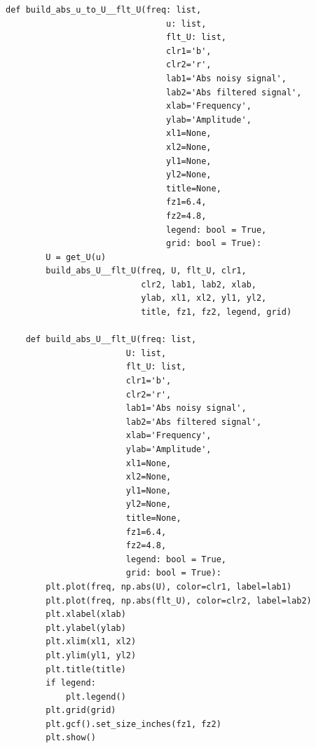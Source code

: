 \documentclass[a4paper, 12pt]{article}
\begin{document}
\begin{lstlisting}[label=l3, caption={Файл builder.py. Реализация построения графиков}]
    def build_abs_u_to_U__flt_U(freq: list,
                                u: list,
                                flt_U: list,
                                clr1='b',
                                clr2='r',
                                lab1='Abs noisy signal',
                                lab2='Abs filtered signal',
                                xlab='Frequency',
                                ylab='Amplitude',
                                xl1=None,
                                xl2=None,
                                yl1=None,
                                yl2=None,
                                title=None,
                                fz1=6.4,
                                fz2=4.8,
                                legend: bool = True,
                                grid: bool = True):
        U = get_U(u)
        build_abs_U__flt_U(freq, U, flt_U, clr1,
                           clr2, lab1, lab2, xlab,
                           ylab, xl1, xl2, yl1, yl2,
                           title, fz1, fz2, legend, grid)

    def build_abs_U__flt_U(freq: list,
                        U: list,
                        flt_U: list,
                        clr1='b',
                        clr2='r',
                        lab1='Abs noisy signal',
                        lab2='Abs filtered signal',
                        xlab='Frequency',
                        ylab='Amplitude',
                        xl1=None,
                        xl2=None,
                        yl1=None,
                        yl2=None,
                        title=None,
                        fz1=6.4,
                        fz2=4.8,
                        legend: bool = True,
                        grid: bool = True):
        plt.plot(freq, np.abs(U), color=clr1, label=lab1)
        plt.plot(freq, np.abs(flt_U), color=clr2, label=lab2)
        plt.xlabel(xlab)
        plt.ylabel(ylab)
        plt.xlim(xl1, xl2)
        plt.ylim(yl1, yl2)
        plt.title(title)
        if legend:
            plt.legend()
        plt.grid(grid)
        plt.gcf().set_size_inches(fz1, fz2)
        plt.show()
    \end{lstlisting}
\end{document}

